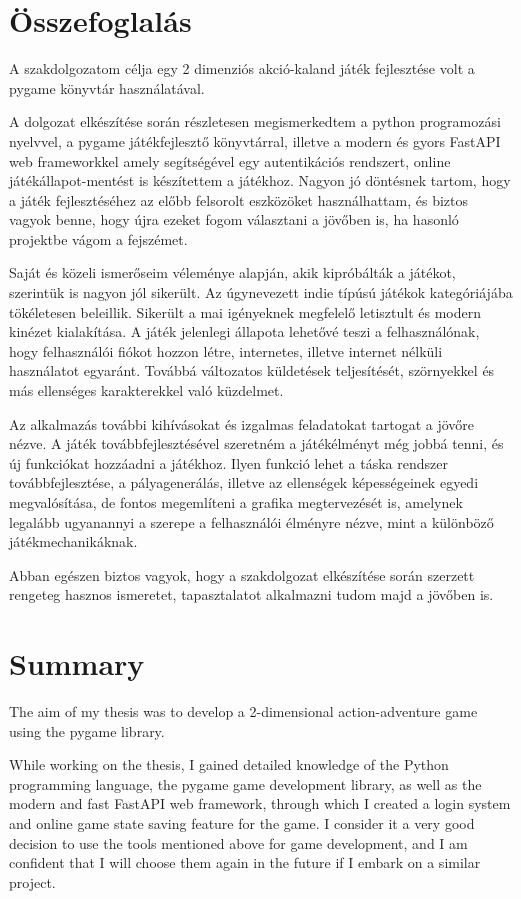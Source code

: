\chapter{Összefoglalás}

 A szakdolgozatom célja egy 2 dimenziós akció-kaland játék fejlesztése volt a pygame könyvtár használatával.

A dolgozat elkészítése során részletesen megismerkedtem a python programozási nyelvvel, a pygame játékfejlesztő könyvtárral, illetve a modern és gyors FastAPI web frameworkkel amely segítségével egy autentikációs rendszert, online játékállapot-mentést is készítettem a játékhoz. Nagyon jó döntésnek tartom, hogy a játék fejlesztéséhez az előbb felsorolt eszközöket használhattam, és biztos vagyok benne, hogy újra ezeket fogom választani a jövőben is, ha hasonló projektbe vágom a fejszémet.

Saját és közeli ismerőseim véleménye alapján, akik kipróbálták a játékot, szerintük is nagyon jól sikerült. Az úgynevezett indie típúsú játékok kategóriájába tökéletesen beleillik. Sikerült a mai igényeknek megfelelő letisztult és modern kinézet kialakítása. A játék jelenlegi állapota lehetővé teszi a felhasználónak, hogy felhasználói fiókot hozzon létre, internetes, illetve internet nélküli használatot egyaránt. Továbbá változatos küldetések teljesítését, szörnyekkel és más ellenséges karakterekkel való küzdelmet.

Az alkalmazás további kihívásokat és izgalmas feladatokat tartogat a jövőre nézve. A játék továbbfejlesztésével szeretném a játékélményt még jobbá tenni, és új funkciókat hozzáadni a játékhoz. Ilyen funkció lehet a táska rendszer továbbfejlesztése, a pályagenerálás, illetve az ellenségek képességeinek egyedi megvalósítása, de fontos megemlíteni a grafika megtervezését is, amelynek legalább ugyanannyi a szerepe a felhasználói élményre nézve, mint a különböző játékmechanikáknak.  

Abban egészen biztos vagyok, hogy a szakdolgozat elkészítése során szerzett rengeteg hasznos ismeretet, tapasztalatot alkalmazni tudom majd a jövőben is.

\chapter{Summary}

 The aim of my thesis was to develop a 2-dimensional action-adventure game using the pygame library.

While working on the thesis, I gained detailed knowledge of the Python programming language, the pygame game development library, as well as the modern and fast FastAPI web framework, through which I created a login system and online game state saving feature for the game. I consider it a very good decision to use the tools mentioned above for game development, and I am confident that I will choose them again in the future if I embark on a similar project.

